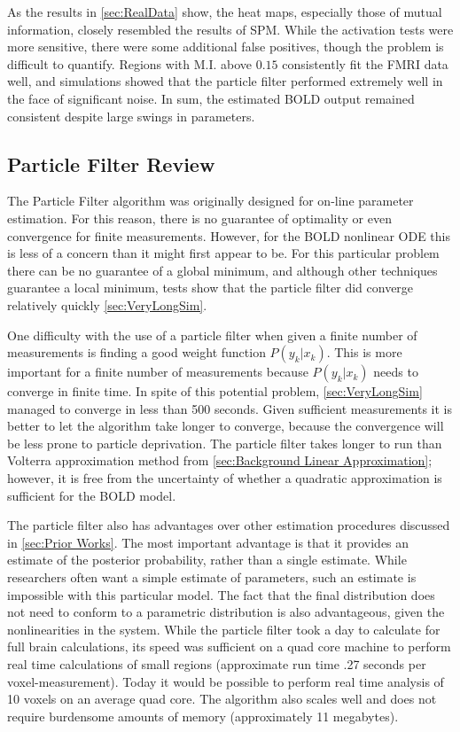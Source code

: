 As the results in \autoref{sec:RealData} show, the heat maps, especially
those of mutual information, closely resembled the results of SPM. While the activation
tests were more sensitive, there were some additional false positives,
though the problem is difficult to quantify. Regions with M.I. above
$0.15$ consistently fit the FMRI data well, and simulations showed that
the particle filter performed extremely well in the face of significant
noise. In sum, the estimated BOLD output remained consistent despite
large swings in parameters.

\subsection{Particle Filter Review}
The Particle Filter algorithm was originally designed for on-line parameter
estimation. For this reason, there is no guarantee of optimality or even
convergence for finite measurements. However, for the BOLD nonlinear ODE
this is less of a concern than it might first appear to be. For this
particular problem there can be no guarantee of a global minimum, and although
other techniques guarantee a local minimum, tests show that the particle
filter did converge relatively quickly \autoref{sec:VeryLongSim}.

One difficulty
with the use of a particle filter when given a finite number of measurements is finding
a good weight function $P(y_k | x_k)$. This is more important for a finite
number of measurements because $P(y_k | x_k)$ needs to converge in finite time.
In spite of this potential problem, \autoref{sec:VeryLongSim} managed
to converge in less than 500 seconds.  Given sufficient
measurements it is better to let the algorithm take longer to converge, because the
convergence will be less prone to particle deprivation. The particle filter takes longer
to run than Volterra approximation method from \autoref{sec:Background Linear Approximation};
however, it is free from the uncertainty of whether a quadratic approximation is
sufficient for the BOLD model.

The particle filter also has advantages over other estimation procedures
discussed in \autoref{sec:Prior Works}. The most important advantage is that it provides
an estimate of the posterior probability, rather than a single estimate. While researchers
often want a simple estimate of parameters, such an estimate is impossible with this particular
model. The fact that the final distribution does not need to conform to a
parametric distribution is also advantageous, given the nonlinearities in the system.
While the particle filter took a day to calculate for full brain calculations, its speed
was sufficient on a quad core machine to perform real time calculations of small regions
(approximate run time .27 seconds per voxel-measurement). Today it would be possible
 to perform real time analysis of 10 voxels on an average quad core. The algorithm also scales
well and does not require burdensome amounts of memory (approximately 11 megabytes).

